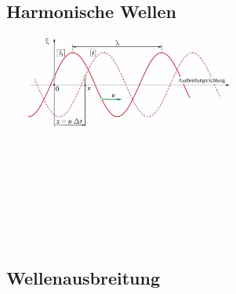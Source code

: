 \subsection{Harmonische Wellen}
\begin{center}
	\begin{minipage}{0.2\textwidth}
		
	\end{minipage}%
	\begin{minipage}{0.3\textwidth}
		\includegraphics[height=3cm,keepaspectratio=true]{Images/harmonische_welle.png}
	\end{minipage}
\end{center}
\begin{center}
	\begin{minipage}{0.25\textwidth}
		\\
		\\
		\\
	\end{minipage}%
	\begin{minipage}{0.25\textwidth}
		\\
		\\
		\\
	\end{minipage}
\end{center}






\subsection{Wellenausbreitung}
